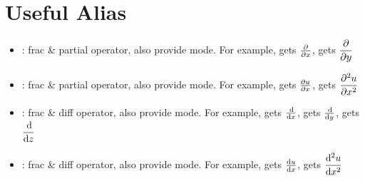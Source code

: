 \documentclass{article}
\begin{document}
\section{Useful Alias}
\begin{itemize}
\item {}: frac \& partial operator, also provide  mode. For example,  gets ${\frac{\partial}{\partial {x}}}$,  gets ${\dfrac{\partial}{\partial {y}}}$

\item {}: frac \& partial operator, also provide  mode. For example,  gets ${\frac{\partial {u}}{\partial {x}}}$,  gets ${\dfrac{\partial {^2u}}{\partial {x^2}}}$

\item {}: frac \& diff operator, also provide  mode. For example,  gets ${\frac{\operatorname{d\!}}{\operatorname{d\!} {x}}}$,  gets ${\frac{\operatorname{d\!}}{\operatorname{d\!} {y}}}$,  gets ${\dfrac{\operatorname{d\!}}{\operatorname{d\!} {z}}}$

\item {}: frac \& diff operator, also provide  mode. For example,  gets ${\frac{\operatorname{d\!} {u}}{\operatorname{d\!} {x}}}$,  gets ${\dfrac{\operatorname{d\!} {^2u}}{\operatorname{d\!} {x^2}}}$
\end{itemize}

\end{document}
